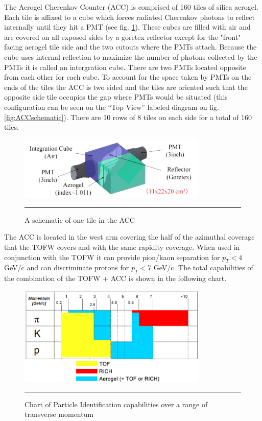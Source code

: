 The Aerogel Cherenkov Counter (ACC) is comprised of 160 tiles of silica aerogel. Each tile is affixed to a cube which forces radiated Cherenkov photons to reflect internally until they hit a PMT (see fig. \ref{fig:accchannel}). These cubes are filled with air and are covered on all exposed sides by a goretex reflector except for the "front" facing aerogel tile side and the two cutouts where the PMTs attach. Because the cube uses internal reflection to maximize the number of photons collected by the PMTs it is called an intergration cube. There are two PMTs located opposite from each other for each cube. To account for the space taken by PMTs on the ends of the tiles the ACC is two sided and the tiles are oriented such that the opposite side tile occupies the gap where PMTs would be situated (this configuration can be seen on the ``Top View'' labeled diagram on fig. \ref{fig:ACCschematic}). There are 10 rows of 8 tiles on each side for a total of 160 tiles.

\begin{figure}[htbp!]
  \centering
    \includegraphics[width=0.8\textwidth]{Figures/aerogelchannel.JPG}
    \rule{35em}{0.5pt}
  \caption[A schematic of one tile in the ACC]{A schematic of one tile in the ACC}
  \label{fig:accchannel}
\end{figure}

The ACC is located in the west arm covering the half of the azimuthal coverage that the TOFW covers and with the same rapidity coverage. When used in conjunction with the TOFW it can provide pion/kaon separation for $p_{T} < 4$ GeV/c and can discriminate protons for $p_{T} < 7$ GeV/c.  The total capabilities of the combination of the TOFW + ACC is shown in the following chart.

\begin{figure}[h!]
  \centering
    \includegraphics[width=0.8\textwidth]{Figures/accrange.jpg}
    \rule{35em}{0.5pt}
  \caption[Chart of Particle Identification capabilities over a range of transverse momentum]{Chart of Particle Identification capabilities over a range of transverse momentum}
  \label{fig:PIDrange}
\end{figure}

